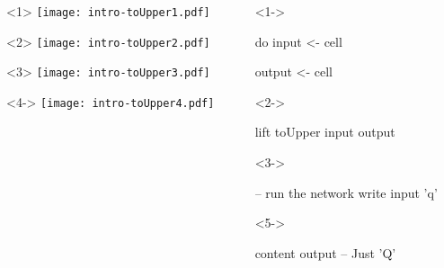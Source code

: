 \documentclass[UKenglish,usenames,dvipsnames,svgnames,table,aspectratio=169,mathserif]{beamer}
\begin{document}
\begin{frame}[fragile]
\centering

\begin{columns}
\begin{column}{0.5\textwidth}
\begin{overlayarea}{0.5\textwidth}{0.4\textheight}
\begin{onlyenv}<1>
\texttt{[image: intro-toUpper1.pdf]}
\end{onlyenv}
\begin{onlyenv}<2>
\texttt{[image: intro-toUpper2.pdf]}
\end{onlyenv}
\begin{onlyenv}<3>
\texttt{[image: intro-toUpper3.pdf]}
\end{onlyenv}
\begin{onlyenv}<4->
\texttt{[image: intro-toUpper4.pdf]}
\end{onlyenv}
\end{overlayarea}
\end{column}

\begin{column}{0.5\textwidth}
\begin{overlayarea}{\textwidth}{0.3\textheight}
\begin{onlyenv}<1->
\begin{haskellcode}
do
  input  <- cell
\end{haskellcode}
\begin{haskellcode}
  output <- cell
\end{haskellcode}
\end{onlyenv}
\begin{onlyenv}<2->
\begin{haskellcode}
  lift toUpper input output
\end{haskellcode}
\end{onlyenv}
\end{overlayarea}
\begin{overlayarea}{\textwidth}{0.2\textheight}
\begin{onlyenv}<3->
\begin{haskellcode}
  -- run the network
  write input 'q'
\end{haskellcode}
\end{onlyenv}
\begin{onlyenv}<5->
\begin{haskellcode}
  content output   -- Just 'Q'
\end{haskellcode}
\end{onlyenv}
\end{overlayarea}
\end{column}
\end{columns}
\end{frame}
\end{document}
